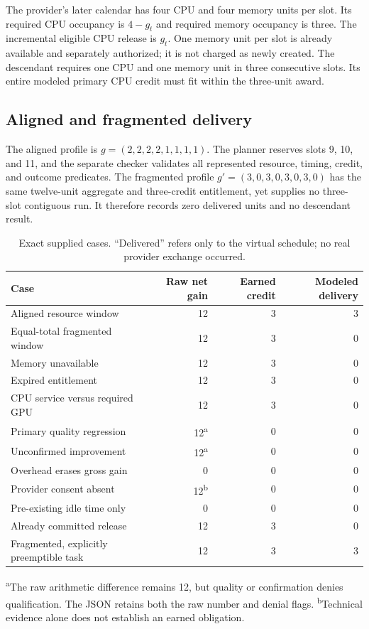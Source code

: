 \documentclass[11pt,letterpaper]{article}
\theoremstyle{remark}\newtheorem{remark}{Remark}[section]
\begin{document}
The provider's later calendar has four CPU and four memory units per slot. Its required CPU occupancy is $4-g_t$ and required memory occupancy is three. The incremental eligible CPU release is $g_t$. One memory unit per slot is already available and separately authorized; it is not charged as newly created. The descendant requires one CPU and one memory unit in three consecutive slots. Its entire modeled primary CPU credit must fit within the three-unit award.

\subsection{Aligned and fragmented delivery}
The aligned profile is $g=(2,2,2,2,1,1,1,1)$. The planner reserves slots 9, 10, and 11, and the separate checker validates all represented resource, timing, credit, and outcome predicates. The fragmented profile $g'=(3,0,3,0,3,0,3,0)$ has the same twelve-unit aggregate and three-credit entitlement, yet supplies no three-slot contiguous run. It therefore records zero delivered units and no descendant result.

\begin{table}[htbp]\centering\small
\caption{Exact supplied cases. ``Delivered'' refers only to the virtual schedule; no real provider exchange occurred.}\label{tab:cases}
\begin{tabularx}{\linewidth}{@{}Yrrr@{}}\toprule
Case & Raw net gain & Earned credit & Modeled delivery\\\midrule
Aligned resource window & 12 & 3 & 3\\
Equal-total fragmented window & 12 & 3 & 0\\
Memory unavailable & 12 & 3 & 0\\
Expired entitlement & 12 & 3 & 0\\
CPU service versus required GPU & 12 & 3 & 0\\
Primary quality regression & 12\textsuperscript{a} & 0 & 0\\
Unconfirmed improvement & 12\textsuperscript{a} & 0 & 0\\
Overhead erases gross gain & 0 & 0 & 0\\
Provider consent absent & 12\textsuperscript{b} & 0 & 0\\
Pre-existing idle time only & 0 & 0 & 0\\
Already committed release & 12 & 3 & 0\\
Fragmented, explicitly preemptible task & 12 & 3 & 3\\\bottomrule
\end{tabularx}
\par\smallskip\raggedright\footnotesize
\textsuperscript{a}The raw arithmetic difference remains 12, but quality or confirmation denies qualification. The JSON retains both the raw number and denial flags.\quad
\textsuperscript{b}Technical evidence alone does not establish an earned obligation.
\end{table}
\end{document}
